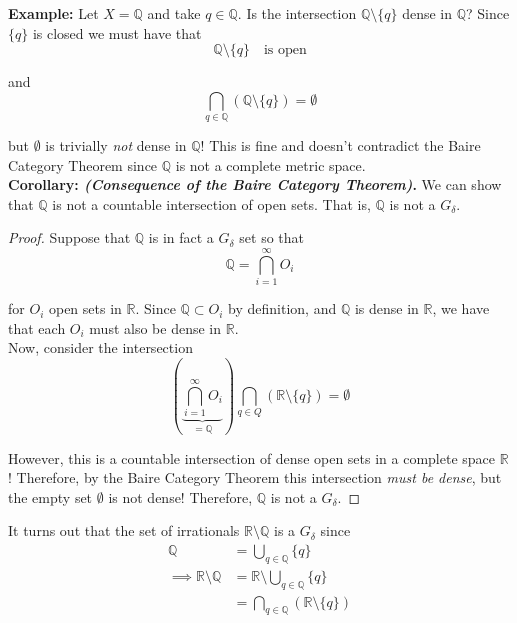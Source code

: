 \documentclass[12pt]{article}
\newlength\tindent
\renewcommand{\indent}{\hspace*{\tindent}}
\newcommand{\R}{\mathbb R}
\newcommand{\Q}{\mathbb Q}
\begin{document}
%
%
{\bf Example:} Let $X = \Q$ and take $q \in \Q$. Is the intersection $\Q \setminus \{q\}$ dense in $\Q$? Since $\{q\}$ is closed we must have that 
\begin{equation*}
	\Q \setminus \{q\} \quad \text{is open}
\end{equation*}

and
\begin{equation*}
	\bigcap_{q \in \Q} \left( \Q \setminus \{q\} \right) = \emptyset
\end{equation*}

but $\emptyset$ is trivially {\em not} dense in $\Q$! This is fine and doesn't contradict the Baire Category Theorem since $\Q$ is not a complete metric space. \\

%
%
{\bf Corollary: {\em (Consequence of the Baire Category Theorem)}.} We can show that $\Q$ is not a countable intersection of open sets. That is, $\Q$ is not a $G_\delta$.

\begin{proof} Suppose that $\Q$ is in fact a $G_\delta$ set so that
\begin{equation*}
	\Q = \bigcap^\infty_{i = 1} O_i
\end{equation*}

for $O_i$ open sets in $\R$. Since $\Q \subset O_i$ by definition, and $\Q$ is dense in $\R$, we have that each $O_i$ must also be dense in $\R$. \\

Now, consider the intersection
\begin{equation*}
	\left( \underbrace{\bigcap^\infty_{i = 1} O_i}_{=\Q} \right) \bigcap_{q \in Q} \left(\R \setminus \{q\} \right) = \emptyset
\end{equation*}

\indent However, this is a countable intersection of dense open sets in a complete space $\R$! Therefore, by the Baire Category Theorem this intersection {\em must be dense}, but the empty set $\emptyset$ is not dense! Therefore, $\Q$ is not a $G_\delta$.
\end{proof}

It turns out that the set of irrationals $\R\setminus\Q$ is a $G_\delta$ since 
\begin{align*}
	\Q &= \bigcup_{q\in\Q} \{q\} \\
	\implies \R\setminus\Q &= \R\setminus\bigcup_{q\in\Q} \{q\} \\
	&= \bigcap_{q\in\Q} \left( \R\setminus\{q\} \right)
\end{align*}
\end{document}
